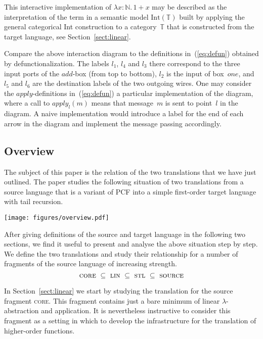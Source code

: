 \documentclass{LMCS}
\theoremstyle{definition}
\theoremstyle{plain}
\newcommand{\NN}{\mathbb{N}}
\newcommand{\Capply}{\textit{apply}}
\newcommand{\tlami}[3]{\lambda {#1}{:}{#2}.\, {#3}}
\newcommand{\TT}{\mathbb{T}}
\newcommand{\Int}[1]{\textrm{Int}(#1)}
\begin{document}
This interactive implementation of $\tlami x \NN {1 + x}$ may be
described as the interpretation of the term in a semantic
model $\Int\TT$ built by applying the general categorical Int construction 
to a category~$\TT$ that is constructed from the target language,
see Section~\ref{sect:linear}.

Compare the above interaction diagram to the definitions in~(\ref{eq:defun}) obtained 
by defunctionalization.
The labels $l_1$, $l_4$ and $l_3$ there correspond to the
three input ports of the $\textit{add}$-box (from top to bottom), $l_2$ is
the input of box~$\textit{one}$, and $l_5$ and $l_6$ are the
destination labels of the two outgoing wires. 
One may consider the $\Capply$-definitions in~(\ref{eq:defun}) a particular 
implementation of the diagram, where a call to $\Capply_l(m)$ means 
that message~$m$ is sent to point~$l$ in the diagram.
A naive implementation would introduce a label for the end of each
arrow in the diagram and implement the message passing accordingly.


\subsection{Overview}

The subject of this paper is the relation of the two translations that
we have just outlined.
The paper studies the following situation of two
translations from a source language that is a variant of 
PCF into a simple first-order target language with tail recursion.
\medskip
\begin{center}
\texttt{[image: figures/overview.pdf]}
\end{center}
\medskip

After giving definitions of the source and target language in the following
two sections, we find it useful to present and analyse the above situation step by step.
We define the two translations and study their relationship for a number of 
fragments of the source language of increasing strength.
\[
\textsc{core}
\ \subseteq\
\textsc{lin}
\ \subseteq\
\textsc{stl}
\ \subseteq\
\textsc{source}
\]

In Section~\ref{sect:linear} we start by studying the translation for the
source fragment \textsc{core}.
This fragment contains just a bare minimum of 
linear $\lambda$-abstraction and application. 
It is nevertheless instructive to consider this fragment as
a setting in which to develop the infrastructure for the translation of
higher-order functions. 
\end{document}
